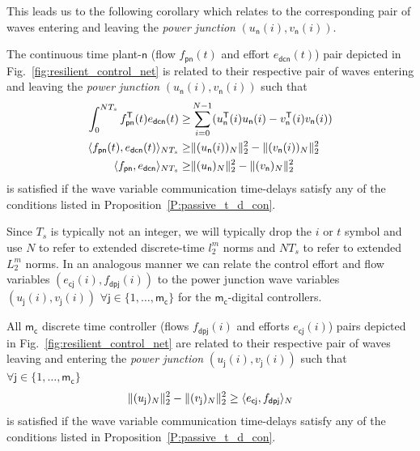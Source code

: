This leads us to the following corollary which relates  to the corresponding pair of waves entering and leaving the {\em power junction} $(u_{\mathsf{n}}(i),v_{\mathsf{n}}(i))$.
\begin{corollary}
\label{C:ps_ph_cor}
The continuous time plant-$\mathsf{n}$ (flow $f_{\mathsf{pn}}(t)$ and
effort $e_{\mathsf{dcn}}(t)$) pair depicted in
Fig.~\ref{fig:resilient_control_net} is related to their respective
pair of waves entering and leaving the {\em power junction}
$(u_{\mathsf{n}}(i),v_{\mathsf{n}}(i))$ such that
\begin{align}
\int_0^{NT_s}  f_{\mathsf{pn}}^{\mathsf{T}} (t) e_{\mathsf{dcn}}(t) \geq& \sum_{i=0}^{N-1} (u_{\mathsf{n}}^{\mathsf{T}}(i)u_{\mathsf{n}}(i) - v_{\mathsf{n}}^{\mathsf{T}}(i)v_{\mathsf{n}}(i))\nonumber\\
\langle f_{\mathsf{pn}}(t),e_{\mathsf{dcn}}(t) \rangle_{NT_s} \geq& \|(u_{\mathsf{n}}(i))_N\|_{2}^2 - \|(v_{\mathsf{n}}(i))_N\|_{2}^2 \nonumber\\
\label{E:ps_ph_cor}
\langle f_{\mathsf{pn}},e_{\mathsf{dcn}} \rangle_{NT_s} \geq& \|(u_{\mathsf{n}})_N\|_{2}^2 - \|(v_{\mathsf{n}})_N\|_{2}^ 2
\end{align}
is satisfied if the wave variable communication time-delays satisfy
any of the conditions listed in Proposition~\ref{P:passive_t_d_con}.
\end{corollary}
Since $T_s$ is typically not an integer, we will typically drop the $i$ or $t$ symbol and use $N$ to refer to extended discrete-time $l^m_2$ norms and $NT_s$ to refer to extended $L^m_2$ norms.  In an analogous manner we can relate the control effort and flow variables $(e_{\mathsf{cj}}(i),f_{\mathsf{dpj}}(i))$ to the power junction wave variables $(u_{\mathsf{j}}(i),v_{\mathsf{j}}(i))$ $\forall \mathsf{j} \in \{1,\dots,\mathsf{m_c}\}$ for the $\mathsf{m_c}$-digital controllers.
\begin{corollary}
\label{C:dig_con_uv_ef}
All $\mathsf{m_c}$ discrete time controller (flows $f_{\mathsf{dpj}}(i)$ and efforts $e_{\mathsf{cj}}(i)$) pairs depicted in Fig.~\ref{fig:resilient_control_net} are related to their respective pair of waves leaving and entering the {\em power junction} $(u_{\mathsf{j}}(i),v_{\mathsf{j}}(i))$ such that $\forall \mathsf{j} \in \{1,\dots,\mathsf{m_c}\}$
\begin{equation}
\label{E:dig_con_uv_ef}
\|(u_{\mathsf{j}})_N\|_{2}^2 - \|(v_{\mathsf{j}})_N\|_{2}^2 \geq
\langle e_{\mathsf{cj}},f_{\mathsf{dpj}} \rangle_{N} 
\end{equation}
is satisfied if the wave variable communication time-delays satisfy
any of the conditions listed in Proposition~\ref{P:passive_t_d_con}.
\end{corollary}
